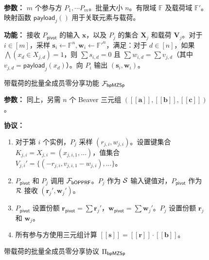 \begin{figure}[!htb]
\begin{framed}
\begin{minipage}[c]{\textwidth}
\begin{trivlist}
\item \textbf{参数：} $m$ 个参与方 $P_1, \cdots P_m$。批量大小 $n$。有限域 $\mathbb{F}$ 及载荷域 $\mathbb{F'}$。映射函数 $\mathsf{payload}_j()$ 用于关联元素与载荷。
\item \textbf{功能：} 接收 $P_\mathsf{pivot}$ 的输入 $\textbf{x}$，以及 $P_j$ 的集合 $\textbf{X}_j$ 和载荷 $\textbf{V}_j$。对于 $i \in [m]$，采样 $\textbf{s}_i \gets \mathbb{F}^n, \textbf{w}_i \gets \mathbb{F'}^n$，满足：对于 $d \in [n]$，如果 $\bigwedge (x_d \in X_{j,d}) = 1$，则 $\sum s_{i,d} = 0$ 且 $\sum w_{i,d} = \sum v_{j,d}$（其中 $v_{j,d} = \mathsf{payload}_j(x_d)$）。向 $P_i$ 输出 $(\textbf{s}_i, \textbf{w}_i)$。
\end{trivlist}
\end{minipage}
\end{framed}
\caption{带载荷的批量全成员零分享功能 $\mathcal{F}_\mathsf{bpMZSp}$}\label{fig:func-mzsp}
\end{figure}

\begin{figure}[!htb]
\begin{framed}
\begin{minipage}[c]{\textwidth}
\begin{trivlist}
\item \textbf{参数：} 同上，另需 $n$ 个 Beaver 三元组 $([\! [ \textbf{a} ] \!], [\! [ \textbf{b} ] \!], [\! [ \textbf{c} ] \!])$。
\item \textbf{协议：}
\begin{enumerate}[itemsep=2pt,topsep=0pt,parsep=0pt,leftmargin=15pt]
\item 对于第 $i$ 个实例，$P_j$ 采样 $(r_{j,i}, w_{j,i})$。设置键集合 $K_{j,i} = X_{j,i} = (x_{j,i,1}, \dots)$，值集合 $V_{j,i}' = \{(-r_{j,i}, v_{j,i,1} - w_{j,i}), \dots\}$。
\item $P_\mathsf{pivot}$ 和 $P_j$ 调用 $\mathcal{F}_\mathsf{bOPPRF}$。$P_j$ 作为 $\mathcal{S}$ 输入键值对，$P_\mathsf{pivot}$ 作为 $\mathcal{R}$ 接收 $(\textbf{r}_{j}',\textbf{w}_{j}')$。
\item $P_\mathsf{pivot}$ 设置份额 $\textbf{r}_{\mathsf{pivot}} = \sum \textbf{r}_{j}'$，$\textbf{w}_{\mathsf{pivot}} = \sum \textbf{w}_{j}'$。$P_j$ 设置份额 $\textbf{r}_{j}$ 和 $\textbf{w}_{j}$。
\item 所有参与方使用三元组计算 $[\! [ \textbf{s} ] \!] = [\! [ \textbf{r} ] \!] \cdot [\! [ \textbf{b} ] \!]$。
\end{enumerate}
\end{trivlist}
\end{minipage}
\end{framed}
\caption{带载荷的批量全成员零分享协议 $\Pi_\mathsf{bpMZSp}$}\label{fig:proto-bpmzsp}
\end{figure}

